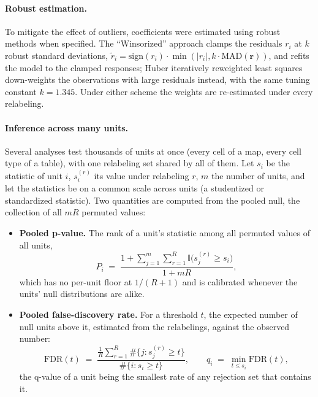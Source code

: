 \documentclass{article}
\begin{document}
\paragraph{Robust estimation.}
To mitigate the effect of outliers, coefficients were estimated using robust methods when specified. The ``Winsorized'' approach clamps the residuals $r_i$ at $k$ robust standard deviations, $\tilde{r}_i = \text{sign}(r_i) \cdot \min(|r_i|, k \cdot \text{MAD}(\mathbf{r}))$, and refits the model to the clamped responses; Huber iteratively reweighted least squares down-weights the observations with large residuals instead, with the same tuning constant $k = 1.345$. Under either scheme the weights are re-estimated under every relabeling.

\paragraph{Inference across many units.}
Several analyses test thousands of units at once (every cell of a map, every cell type of a table), with one relabeling set shared by all of them. Let $s_i$ be the statistic of unit $i$, $s_i^{(r)}$ its value under relabeling $r$, $m$ the number of units, and let the statistics be on a common scale across units (a studentized or standardized statistic). Two quantities are computed from the pooled null, the collection of all $m R$ permuted values:
\begin{itemize}
    \item \textbf{Pooled p-value.} The rank of a unit's statistic among all permuted values of all units,
    \begin{equation}
    P_i \;=\; \frac{1 + \sum_{j=1}^{m}\sum_{r=1}^{R} \mathbb{I}\big(s_j^{(r)} \ge s_i\big)}{1 + mR},
    \end{equation}
    which has no per-unit floor at $1/(R+1)$ and is calibrated whenever the units' null distributions are alike.
    \item \textbf{Pooled false-discovery rate.} For a threshold $t$, the expected number of null units above it, estimated from the relabelings, against the observed number:
    \begin{equation}
    \mathrm{FDR}(t) \;=\; \frac{\frac{1}{R}\sum_{r=1}^{R} \#\{j : s_j^{(r)} \ge t\}}{\#\{i : s_i \ge t\}},
    \qquad
    q_i \;=\; \min_{t \le s_i} \mathrm{FDR}(t),
    \end{equation}
    the q-value of a unit being the smallest rate of any rejection set that contains it.
\end{itemize}
\end{document}
